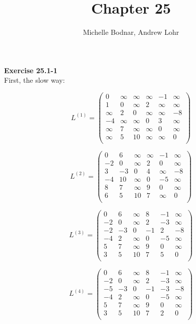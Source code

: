 \documentclass{article}
\title{Chapter 25}
\author{Michelle Bodnar, Andrew Lohr}
\begin{document}
\maketitle
\noindent\textbf{Exercise 25.1-1}\\
First, the slow way:

\[
L^{(1)} = \left(\begin{array}{cccccc}
0&\infty&\infty&\infty&-1&\infty\\
1&0&\infty&2&\infty&\infty\\
\infty&2&0&\infty&\infty&-8\\
-4&\infty&\infty&0&3&\infty\\
\infty&7&\infty&\infty&0&\infty\\
\infty&5&10&\infty&\infty&0\\
\end{array}\right)
\]

\[
L^{(2)} = \left(\begin{array}{cccccc}
0&6&\infty&\infty&-1&\infty\\
-2&0&\infty&2&0&\infty\\
3&-3&0&4&\infty&-8\\
-4&10&\infty&0&-5&\infty\\
8&7&\infty&9&0&\infty\\
6&5&10&7&\infty&0\\
\end{array}\right)
\]

\[
L^{(3)} = \left(\begin{array}{cccccc}
0&6&\infty&8&-1&\infty\\
-2&0&\infty&2&-3&\infty\\
-2&-3&0&-1&2&-8\\
-4&2&\infty&0&-5&\infty\\
5&7&\infty&9&0&\infty\\
3&5&10&7&5&0\\
\end{array}\right)
\]

\[
L^{(4)} = \left(\begin{array}{cccccc}
0&6&\infty&8&-1&\infty\\
-2&0&\infty&2&-3&\infty\\
-5&-3&0&-1&-3&-8\\
-4&2&\infty&0&-5&\infty\\
5&7&\infty&9&0&\infty\\
3&5&10&7&2&0\\
\end{array}\right)
\]
\end{document}
